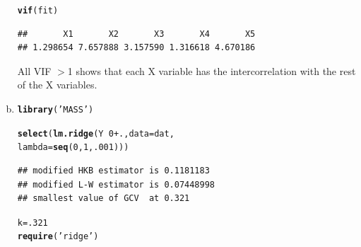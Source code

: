 \documentclass{article}\usepackage[]{graphicx}\usepackage[]{color}
\makeatletter
\newcommand{\hlnum}[1]{\textcolor[rgb]{0.686,0.059,0.569}{#1}}%
\newcommand{\hlstr}[1]{\textcolor[rgb]{0.192,0.494,0.8}{#1}}%
\newcommand{\hlopt}[1]{\textcolor[rgb]{0,0,0}{#1}}%
\newcommand{\hlstd}[1]{\textcolor[rgb]{0.345,0.345,0.345}{#1}}%
\newcommand{\hlkwb}[1]{\textcolor[rgb]{0.69,0.353,0.396}{#1}}%
\newcommand{\hlkwc}[1]{\textcolor[rgb]{0.333,0.667,0.333}{#1}}%
\newcommand{\hlkwd}[1]{\textcolor[rgb]{0.737,0.353,0.396}{\textbf{#1}}}%
\newenvironment{kframe}{%
 \def\at@end@of@kframe{}%
 \ifinner\ifhmode%
  \def\at@end@of@kframe{\end{minipage}}%
  \begin{minipage}{\columnwidth}%
 \fi\fi%
 \def\FrameCommand##1{\hskip\@totalleftmargin \hskip-\fboxsep
 \colorbox{shadecolor}{##1}\hskip-\fboxsep
     \hskip-\linewidth \hskip-\@totalleftmargin \hskip\columnwidth}%
 \MakeFramed {\advance\hsize-\width
   \@totalleftmargin\z@ \linewidth\hsize
   \@setminipage}}%
 {\par\unskip\endMakeFramed%
 \at@end@of@kframe}
\newenvironment{knitrout}{}{} %
\makeatother
\begin{document}
\begin{enumerate}[(a)]
\begin{knitrout}
\begin{kframe}
{\ttfamily\noindent\itshape\color{messagecolor}{\#\# Loading required package: faraway}}\begin{alltt}
  \hlkwd{vif}\hlstd{(fit)}
\end{alltt}


{\ttfamily\noindent\color{warningcolor}{\#\# Warning in vif.lm(fit): No intercept term detected.\ \ Results may surprise.}}\begin{verbatim}
##       X1       X2       X3       X4       X5 
## 1.298654 7.657888 3.157590 1.316618 4.670186
\end{verbatim}
\end{kframe}
\end{knitrout}

\qquad All VIF $>$1 shows that each X variable has the intercorrelation with the rest of the X variables.

\item

\begin{knitrout}
\color{fgcolor}\begin{kframe}
\begin{alltt}
  \hlkwd{library}\hlstd{(}\hlstr{'MASS'}\hlstd{)}
\end{alltt}


{\ttfamily\noindent\color{warningcolor}{\#\# Warning: package 'MASS' was built under R version 3.1.2}}\begin{alltt}
  \hlkwd{select}\hlstd{(}\hlkwd{lm.ridge}\hlstd{(Y} \hlopt{~} \hlnum{0} \hlopt{+} \hlstd{.,} \hlkwc{data} \hlstd{= dat,}
                \hlkwc{lambda} \hlstd{=} \hlkwd{seq}\hlstd{(}\hlnum{0}\hlstd{,} \hlnum{1}\hlstd{,} \hlnum{.001}\hlstd{)))}
\end{alltt}
\begin{verbatim}
## modified HKB estimator is 0.1181183 
## modified L-W estimator is 0.07448998 
## smallest value of GCV  at 0.321
\end{verbatim}
\begin{alltt}
  \hlstd{k} \hlkwb{=} \hlnum{.321}
  \hlkwd{require}\hlstd{(}\hlstr{'ridge'}\hlstd{)}
\end{alltt}


{\ttfamily\noindent\itshape\color{messagecolor}{\#\# Loading required package: ridge}}


\end{kframe}
\end{knitrout}
\end{enumerate}
\end{document}

